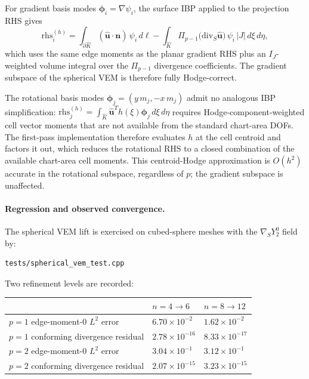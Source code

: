 \documentclass[11pt]{article}
\begin{document}
For gradient basis modes \(\boldsymbol{\phi}_i=\nabla\psi_i\), the surface
IBP applied to the projection RHS gives
\[
  \mathrm{rhs}_i^{(h)}
  = \int_{\partial\hat K}(\hat{\mathbf{u}}\cdot\mathbf{n})\,\psi_i\,d\ell
    - \int_{\hat K}\Pi_{p-1}\bigl(\mathrm{div}_S\hat{\mathbf{u}}\bigr)\,\psi_i\,
      |J|\,d\xi\,d\eta,
\]
which uses the same edge moments as the planar gradient RHS plus an
\(I_J\)-weighted volume integral over the \(\Pi_{p-1}\) divergence
coefficients.  The gradient subspace of the spherical VEM is therefore
fully Hodge-correct.

The rotational basis modes
\(\boldsymbol{\phi}_j=(y\,m_j,-x\,m_j)\) admit no analogous IBP
simplification: \(\mathrm{rhs}_j^{(h)}=\int_{\hat K}\hat{\mathbf{u}}^T
h(\xi)\boldsymbol{\phi}_j\,d\xi\,d\eta\) requires Hodge-component-weighted
cell vector moments that are not available from the standard
chart-area DOFs.  The first-pass implementation therefore evaluates
\(h\) at the cell centroid and factors it out, which reduces the
rotational RHS to a closed combination of the available chart-area
cell moments.  This centroid-Hodge approximation is \(O(h^2)\)
accurate in the rotational subspace, regardless of \(p\); the
gradient subspace is unaffected.

\paragraph{Regression and observed convergence.}
The spherical VEM lift is exercised on cubed-sphere meshes with the
\(\nabla_S Y_2^0\) field by:
\begin{verbatim}
tests/spherical_vem_test.cpp
\end{verbatim}
Two refinement levels are recorded:

\begin{center}
\begin{tabular}{lll}
\toprule
& \(n=4\to 6\) & \(n=8\to 12\) \\
\midrule
\(p=1\) edge-moment-0 \(L^2\) error  & \(6.70\times10^{-2}\) & \(1.62\times10^{-2}\) \\
\(p=1\) conforming divergence residual & \(2.78\times10^{-16}\) & \(8.33\times10^{-17}\) \\
\(p=2\) edge-moment-0 \(L^2\) error  & \(3.04\times10^{-1}\) & \(3.12\times10^{-1}\) \\
\(p=2\) conforming divergence residual & \(2.07\times10^{-15}\) & \(3.23\times10^{-15}\) \\
\bottomrule
\end{tabular}
\end{center}
\end{document}
